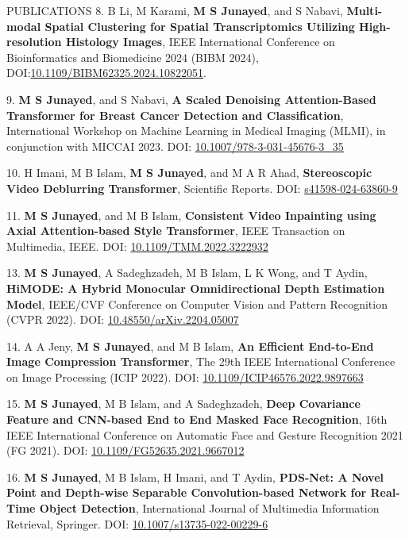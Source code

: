 \begin{rSection}{ PUBLICATIONS}
{8. B Li, M Karami, {\bf M S Junayed}, and S Nabavi, {\bf{Multi-modal Spatial Clustering for Spatial Transcriptomics Utilizing High-resolution Histology Images}}, IEEE International Conference on Bioinformatics and Biomedicine 2024 (BIBM 2024), DOI:{\href{https://ieeexplore.ieee.org/document/10822051}{10.1109/BIBM62325.2024.10822051}}.}

{9. {\bf M S Junayed}, and S Nabavi, {\bf{A Scaled Denoising Attention-Based Transformer for Breast Cancer Detection and Classification}}, International Workshop on Machine Learning in Medical Imaging (MLMI), in conjunction with MICCAI 2023. DOI: {\href{https://link.springer.com/chapter/10.1007/978-3-031-45676-3_35}{10.1007/978-3-031-45676-3\_35}}}

{10. H Imani, M B Islam, {\bf M S Junayed}, and M A R Ahad, {\bf{Stereoscopic Video Deblurring Transformer}}, Scientific Reports. DOI: {\href{https://www.nature.com/articles/s41598-024-63860-9}{s41598-024-63860-9}}}

{11. {\bf M S Junayed}, and M B Islam, {\bf{Consistent Video Inpainting using Axial Attention-based Style Transformer}}, IEEE Transaction on Multimedia, IEEE. DOI: {\href{https://ieeexplore.ieee.org/abstract/document/9954176}{10.1109/TMM.2022.3222932}}}

{13. {\bf M S Junayed}, A Sadeghzadeh, M B Islam, L K Wong, and T Aydin, {\bf{HiMODE: A Hybrid Monocular Omnidirectional Depth Estimation Model}}, IEEE/CVF Conference on Computer Vision and Pattern Recognition (CVPR 2022). DOI: {\href{https://arxiv.org/abs/2204.05007}{10.48550/arXiv.2204.05007}}

{14. A A Jeny, {\bf M S Junayed}, and M B Islam, {\bf{An Efficient End-to-End Image Compression Transformer}}, The 29th IEEE International Conference on Image Processing (ICIP 2022). DOI: {\href{https://ieeexplore.ieee.org/abstract/document/9897663}{10.1109/ICIP46576.2022.9897663}}}

{15. {\bf M S Junayed}, M B Islam, and A Sadeghzadeh, {\bf{Deep Covariance Feature and CNN-based End to End Masked Face Recognition}}, 16th IEEE International Conference on Automatic Face and Gesture Recognition 2021 (FG 2021). DOI: {\href{https://ieeexplore.ieee.org/document/9667012}{10.1109/FG52635.2021.9667012}}}

{16. {\bf M S Junayed}, M B Islam, H Imani, and  T Aydin, {\bf{PDS-Net: A Novel Point and Depth-wise Separable Convolution-based Network for Real-Time Object Detection}}, International Journal of Multimedia Information Retrieval, Springer. DOI: {\href{https://link.springer.com/article/10.1007/s13735-022-00229-6}{10.1007/s13735-022-00229-6}}}

}
\end{rSection}

